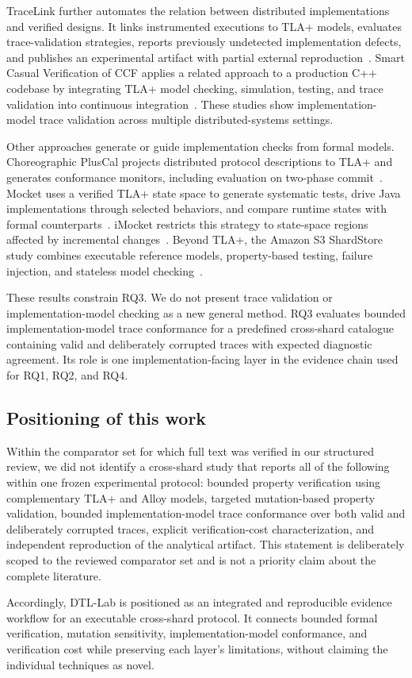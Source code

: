 TraceLink further automates the relation between distributed implementations
and verified designs. It links instrumented executions to TLA+ models,
evaluates trace-validation strategies, reports previously undetected
implementation defects, and publishes an experimental artifact with partial
external reproduction~\cite{hackett2025tracelink}. Smart Casual Verification
of CCF applies a related approach to a production C++ codebase by integrating
TLA+ model checking, simulation, testing, and trace validation into continuous
integration~\cite{howard2025ccf}. These studies show implementation-model trace
validation across multiple distributed-systems settings.

Other approaches generate or guide implementation checks from formal models.
Choreographic PlusCal projects distributed protocol descriptions to TLA+ and
generates conformance monitors, including evaluation on two-phase
commit~\cite{foo2023choreographic}. Mocket uses a verified TLA+ state space to
generate systematic tests, drive Java implementations through selected
behaviors, and compare runtime states with formal
counterparts~\cite{wang2023mocket}. iMocket restricts this strategy to
state-space regions affected by incremental changes~\cite{gao2025imocket}.
Beyond TLA+, the Amazon S3 ShardStore study combines executable reference
models, property-based testing, failure injection, and stateless model
checking~\cite{bornholt2021s3}.

These results constrain RQ3. We do not present trace validation or
implementation-model checking as a new general method. RQ3 evaluates bounded
implementation-model trace conformance for a predefined cross-shard catalogue
containing valid and deliberately corrupted traces with expected diagnostic
agreement. Its role is one implementation-facing layer in the evidence chain
used for RQ1, RQ2, and RQ4.

\subsection{Positioning of this work}
\label{subsec:related-positioning}

Within the comparator set for which full text was verified in our structured
review, we did not identify a cross-shard study that reports all of the
following within one frozen experimental protocol: bounded property
verification using complementary TLA+ and Alloy models, targeted mutation-based
property validation, bounded implementation-model trace conformance over both
valid and deliberately corrupted traces, explicit verification-cost
characterization, and independent reproduction of the analytical artifact.
This statement is deliberately scoped to the reviewed comparator set and is
not a priority claim about the complete literature.

Accordingly, DTL-Lab is positioned as an integrated and reproducible evidence
workflow for an executable cross-shard protocol. It connects bounded formal
verification, mutation sensitivity, implementation-model conformance, and
verification cost while preserving each layer's limitations, without claiming
the individual techniques as novel.
